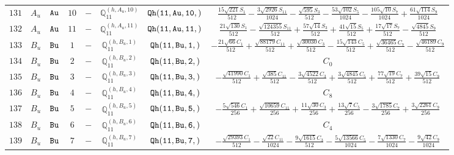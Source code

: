 \documentclass[fleqn,8pt]{jsarticle}
\begin{document}
\begin{table}[ht!]
\begin{center}
\begin{tabular}{cccccccc}
$ 131 $ & $ A_{u} $ & $ {\tt Au} $ & $ 10 $ & $ - $ & $ \mathbb{Q}_{11}^{(h,A_{u},10)} $ & $ {\tt Qh(11,Au,10,)} $ & $ \frac{15 \sqrt{221} S_{1}}{512} - \frac{3 \sqrt{2926} S_{11}}{1024} - \frac{\sqrt{595} S_{3}}{512} - \frac{53 \sqrt{102} S_{5}}{1024} - \frac{105 \sqrt{10} S_{7}}{1024} + \frac{61 \sqrt{114} S_{9}}{1024} $ \\
$ 132 $ & $ A_{u} $ & $ {\tt Au} $ & $ 11 $ & $ - $ & $ \mathbb{Q}_{11}^{(h,A_{u},11)} $ & $ {\tt Qh(11,Au,11,)} $ & $ \frac{21 \sqrt{130} S_{1}}{512} - \frac{\sqrt{124355} S_{11}}{512} + \frac{57 \sqrt{14} S_{3}}{512} + \frac{41 \sqrt{15} S_{5}}{512} + \frac{17 \sqrt{17} S_{7}}{512} - \frac{\sqrt{4845} S_{9}}{512} $ \\
$ 133 $ & $ B_{u} $ & $ {\tt Bu} $ & $ 1 $ & $ - $ & $ \mathbb{Q}_{11}^{(h,B_{u},1)} $ & $ {\tt Qh(11,Bu,1,)} $ & $ - \frac{21 \sqrt{66} C_{1}}{512} + \frac{\sqrt{88179} C_{11}}{512} + \frac{\sqrt{30030} C_{3}}{512} - \frac{15 \sqrt{143} C_{5}}{512} + \frac{\sqrt{36465} C_{7}}{512} - \frac{\sqrt{46189} C_{9}}{512} $ \\
$ 134 $ & $ B_{u} $ & $ {\tt Bu} $ & $ 2 $ & $ - $ & $ \mathbb{Q}_{11}^{(h,B_{u},2)} $ & $ {\tt Qh(11,Bu,2,)} $ & $ C_{0} $ \\
$ 135 $ & $ B_{u} $ & $ {\tt Bu} $ & $ 3 $ & $ - $ & $ \mathbb{Q}_{11}^{(h,B_{u},3)} $ & $ {\tt Qh(11,Bu,3,)} $ & $ - \frac{\sqrt{41990} C_{1}}{512} + \frac{\sqrt{385} C_{11}}{512} - \frac{3 \sqrt{4522} C_{3}}{512} + \frac{3 \sqrt{4845} C_{5}}{512} + \frac{77 \sqrt{19} C_{7}}{512} + \frac{39 \sqrt{15} C_{9}}{512} $ \\
$ 136 $ & $ B_{u} $ & $ {\tt Bu} $ & $ 4 $ & $ - $ & $ \mathbb{Q}_{11}^{(h,B_{u},4)} $ & $ {\tt Qh(11,Bu,4,)} $ & $ C_{8} $ \\
$ 137 $ & $ B_{u} $ & $ {\tt Bu} $ & $ 5 $ & $ - $ & $ \mathbb{Q}_{11}^{(h,B_{u},5)} $ & $ {\tt Qh(11,Bu,5,)} $ & $ - \frac{5 \sqrt{546} C_{1}}{256} + \frac{\sqrt{10659} C_{11}}{256} + \frac{11 \sqrt{30} C_{3}}{256} + \frac{13 \sqrt{7} C_{5}}{256} - \frac{3 \sqrt{1785} C_{7}}{256} + \frac{3 \sqrt{2261} C_{9}}{256} $ \\
$ 138 $ & $ B_{u} $ & $ {\tt Bu} $ & $ 6 $ & $ - $ & $ \mathbb{Q}_{11}^{(h,B_{u},6)} $ & $ {\tt Qh(11,Bu,6,)} $ & $ C_{4} $ \\
$ 139 $ & $ B_{u} $ & $ {\tt Bu} $ & $ 7 $ & $ - $ & $ \mathbb{Q}_{11}^{(h,B_{u},7)} $ & $ {\tt Qh(11,Bu,7,)} $ & $ - \frac{\sqrt{29393} C_{1}}{512} - \frac{\sqrt{22} C_{11}}{1024} - \frac{9 \sqrt{1615} C_{3}}{512} - \frac{5 \sqrt{13566} C_{5}}{1024} - \frac{7 \sqrt{1330} C_{7}}{1024} - \frac{9 \sqrt{42} C_{9}}{1024} $ \\

\end{tabular}
\end{center}
\end{table}
\end{document}
